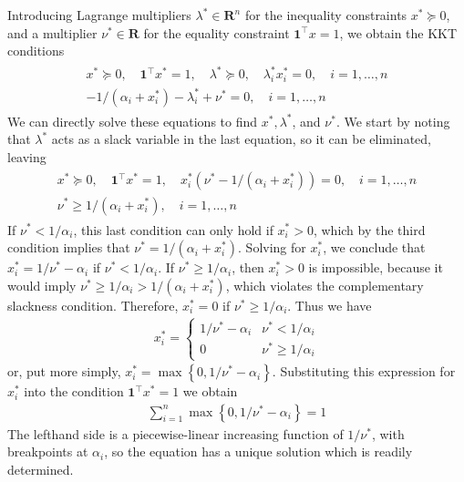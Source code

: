 \documentclass{article}
\begin{document}
\begin{exma}
Introducing Lagrange multipliers $\lambda^*  \in \mathbf{R}^{n}$ for the inequality constraints $x^*  \succeq 0$, and a multiplier $\nu^*  \in \mathbf{R}$ for the equality constraint $\mathbf{1}^{\top} x=1$, we obtain the KKT conditions
\begin{align*}
\begin{array}{cc}
x^*  \succeq 0, \quad \mathbf{1}^{\top} x^* =1, \quad \lambda^*  \succeq 0, \quad \lambda_{i}^*  x_{i}^* =0, \quad i=1, \ldots, n \\
-1 /\left(\alpha_{i}+x_{i}^* \right)-\lambda_{i}^* +\nu^* =0, \quad i=1, \ldots, n
\end{array}
\end{align*}
We can directly solve these equations to find $x^* , \lambda^* $, and $\nu^*  .$ We start by noting that $\lambda^* $ acts as a slack variable in the last equation, so it can be eliminated, leaving
\begin{align*}
\begin{array}{r}
x^*  \succeq 0, \quad \mathbf{1}^{\top} x^* =1, \quad x_{i}^* \left(\nu^* -1 /\left(\alpha_{i}+x_{i}^* \right)\right)=0, \quad i=1, \ldots, n \\
\nu^*  \geq 1 /\left(\alpha_{i}+x_{i}^* \right), \quad i=1, \ldots, n
\end{array}
\end{align*}
If $\nu^* <1 / \alpha_{i}$, this last condition can only hold if $x_{i}^* >0$, which by the third condition implies that $\nu^* =1 /\left(\alpha_{i}+x_{i}^* \right) .$ Solving for $x_{i}^* $, we conclude that $x_{i}^* =1 / \nu^* -\alpha_{i}$ if $\nu^* <1 / \alpha_{i} .$ If $\nu^*  \geq 1 / \alpha_{i}$, then $x_{i}^* >0$ is impossible, because it would imply $\nu^*  \geq 1 / \alpha_{i}>1 /\left(\alpha_{i}+x_{i}^* \right)$, which violates the complementary slackness condition. Therefore, $x_{i}^* =0$ if $\nu^*  \geq 1 / \alpha_{i} .$ Thus we have
\begin{align*}
x_{i}^* = \begin{cases}1 / \nu^* -\alpha_{i} & \nu^* <1 / \alpha_{i} \\ 0 & \nu^*  \geq 1 / \alpha_{i}\end{cases}
\end{align*}
or, put more simply, $x_{i}^* =\max \left\{0,1 / \nu^* -\alpha_{i}\right\} .$ Substituting this expression for $x_{i}^* $ into the condition $\mathbf{1}^{\top} x^* =1$ we obtain
\begin{align*}
\sum_{i=1}^{n} \max \left\{0,1 / \nu^* -\alpha_{i}\right\}=1
\end{align*}
The lefthand side is a piecewise-linear increasing function of $1 / \nu^* $, with breakpoints at $\alpha_{i}$, so the equation has a unique solution which is readily determined.


\end{exma}
\end{document}
